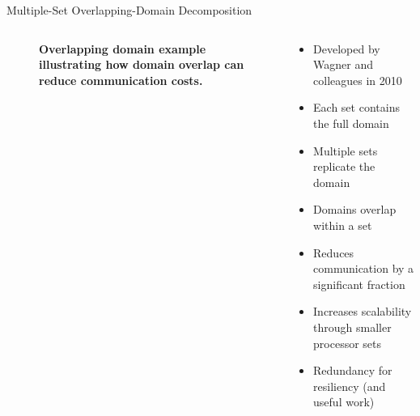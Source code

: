 \documentclass{beamer}
\begin{document}
\begin{frame}{Multiple-Set Overlapping-Domain Decomposition}

  \begin{columns}

    \begin{column}{0.5\textwidth}
      \begin{figure}[htpb!]
        \begin{center}
          \scalebox{0.75}{  }
        \end{center}
        \caption{\textbf{Overlapping domain example illustrating how
            domain overlap can reduce communication costs.}}
      \end{figure}
    \end{column}

    \begin{column}{0.5\textwidth}
      \begin{itemize}
      \item Developed by Wagner and colleagues in 2010
      \item Each set contains the full domain
      \item Multiple sets replicate the domain
      \item Domains overlap within a set
      \item Reduces communication by a significant fraction
      \item Increases scalability through smaller processor sets
      \item Redundancy for resiliency (and useful work)
      \end{itemize}
    \end{column}

  \end{columns}

\end{frame}
\end{document}
